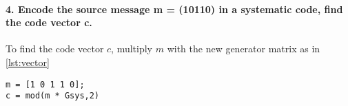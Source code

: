 \documentclass[Main]{subfiles}
\begin{document}
\paragraph{4. Encode the source message m = (10110) in a systematic code, find the code vector c.}

To find the code vector $c$, multiply $m$ with the new generator matrix as in \codeTitle \ref{lst:vector}

\begin{lstlisting}[caption=Code vector, style=Code-Matlab, label=lst:vector]
m = [1 0 1 1 0];
c = mod(m * Gsys,2)
\end{lstlisting}
\end{document}
